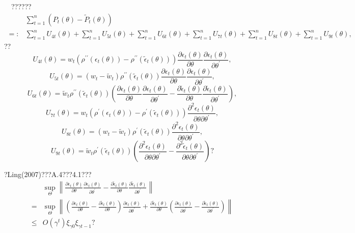 \documentclass[a4paper,12pt,openany,oneside,utf-8]{ctexbook}
\newcommand{\xiaosihao}{\fontsize{12pt}{\baselineskip}\selectfont}
\begin{document}
	\noindent{\xiaosihao\heiti ??~4.3??}~~??????
	\begin{align}
		&\sum_{t=1}^n\left(P_t(\theta)-\tilde{P}_t(\theta)\right)\nonumber\\
		=:&\sum_{t=1}^nU_{4t}(\theta)+\sum_{t=1}^nU_{5t}(\theta)+\sum_{t=1}^nU_{6t}(\theta)+\sum_{t=1}^nU_{7t}(\theta) +\sum_{t=1}^nU_{8t}(\theta)+\sum_{t=1}^nU_{9t}(\theta),\nonumber
	\end{align}
	??
	$$
	U_{4t}(\theta)
	=w_t\left(\rho^{\prime\prime}(\epsilon_t(\theta))-\rho^{\prime\prime}(\tilde{\epsilon}_t(\theta))\right)\frac{\partial \epsilon_{t}\left(\theta\right)}{\partial \theta} \frac{\partial \epsilon_{t}\left(\theta\right)}{\partial \theta^{\prime}} ,
	$$
	$$
	U_{5t}(\theta)=
	(w_t-\tilde{w}_t)\rho^{\prime\prime}(\tilde{\epsilon}_t(\theta))\frac{\partial \epsilon_{t}\left(\theta\right)}{\partial \theta} \frac{\partial \epsilon_{t}\left(\theta\right)}{\partial \theta^{\prime}} ,
	$$
	$$
	U_{6t}(\theta)=
	\tilde{w}_t\rho^{\prime\prime}(\tilde{\epsilon}_t(\theta))\left(\frac{\partial \epsilon_{t}\left(\theta\right)}{\partial \theta} \frac{\partial \epsilon_{t}\left(\theta\right)}{\partial \theta^{\prime}}-\frac{\partial \tilde{\epsilon}_{t}\left(\theta\right)}{\partial \theta} \frac{\partial \tilde{\epsilon}_{t}\left(\theta\right)}{\partial \theta^{\prime}}\right) ,
	$$
	$$
	U_{7t}(\theta)=
	w_t\left(\rho^{\prime}(\epsilon_t(\theta))-\rho^{\prime}(\tilde{\epsilon}_t(\theta))\right)\frac{\partial^{2} \epsilon_{t}\left(\theta\right)}{\partial \theta \partial \theta^{\prime}} ,
	$$
	$$
	U_{8t}(\theta)=
	\left(w_t-\tilde{w}_t\right)\rho^{\prime}(\tilde{\epsilon}_t(\theta))\frac{\partial^{2} \epsilon_{t}\left(\theta\right)}{\partial \theta \partial \theta^{\prime}} ,
	$$
	$$
	U_{9t}(\theta)=
	\tilde{w}_t\rho^{\prime}(\tilde{\epsilon}_t(\theta))\left(\frac{\partial^{2} \epsilon_{t}\left(\theta\right)}{\partial \theta \partial \theta^{\prime}}-\frac{\partial^{2} \tilde{\epsilon}_{t}\left(\theta\right)}{\partial \theta \partial \theta^{\prime}}\right)  \mbox{?}
	$$
	
	\noindent ?Ling(2007)???A.4???4.1???
	\begin{align}
		&\sup _{\Theta}\left\|\frac{\partial \epsilon_{t}\left(\theta\right)}{\partial \theta} \frac{\partial \epsilon_{t}\left(\theta\right)}{\partial \theta^{\prime}}-\frac{\partial \tilde{\epsilon}_{t}\left(\theta\right)}{\partial \theta} \frac{\partial \tilde{\epsilon}_{t}\left(\theta\right)}{\partial \theta^{\prime}}\right\|\nonumber\\
		=&\sup _{\Theta}\left\|\left(\frac{\partial \epsilon_{t}\left(\theta\right)}{\partial \theta} -\frac{\partial \tilde{\epsilon}_{t}\left(\theta\right)}{\partial \theta}\right)\frac{\partial \epsilon_{t}\left(\theta\right)}{\partial \theta^{\prime}}+ \frac{\partial \tilde{\epsilon}_{t}\left(\theta\right)}{\partial \theta}\left(\frac{\partial \epsilon_{t}\left(\theta\right)}{\partial \theta^{\prime}}-\frac{\partial \tilde{\epsilon}_{t}\left(\theta\right)}{\partial \theta^{\prime}}\right)\right\|\nonumber\\
		\le & O(\gamma^{t})\xi_{\gamma 0}\xi_{\gamma t-1} \mbox{?}\nonumber
	\end{align}
	
\end{document}
